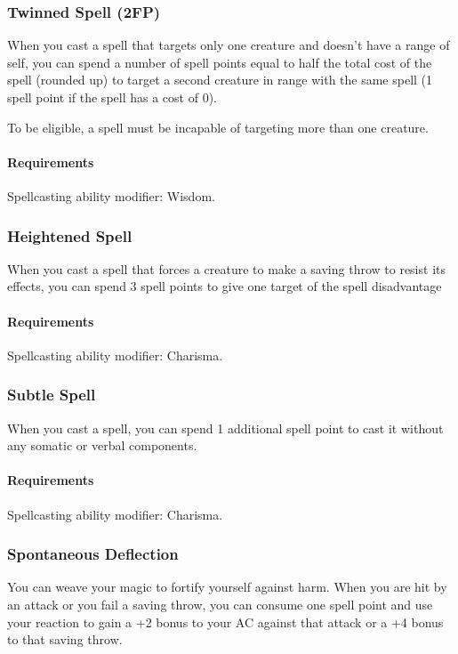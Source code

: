 \subsubsection{Twinned Spell (2FP)} \label{feat::twinnedspell}
    When you cast a spell that targets only one creature and doesn't have a range of self, you can spend a number of spell points equal to half the total cost of the spell (rounded up) to target a second creature in range with the same spell (1 spell point if the spell has a cost of 0).

    To be eligible, a spell must be incapable of targeting more than one creature.
    \paragraph{Requirements} Spellcasting ability modifier: Wisdom.

\subsubsection{Heightened Spell} \label{feat::heightenedspell}
    When you cast a spell that forces a creature to make a saving throw to resist its effects, you can spend 3 spell points to give one target of the spell disadvantage
    \paragraph{Requirements} Spellcasting ability modifier: Charisma.
\subsubsection{Subtle Spell} \label{feat::subtlespell}
    When you cast a spell, you can spend 1 additional spell point to cast it without any somatic or verbal components.
    \paragraph{Requirements} Spellcasting ability modifier: Charisma.
\subsubsection{Spontaneous Deflection} \label{feat::spontaneousdeflection}
    You can weave your magic to fortify yourself against harm.
    When you are hit by an attack or you fail a saving throw, you can consume one spell point and use your reaction to gain a +2 bonus to your AC against that attack or a +4 bonus to that saving throw.
